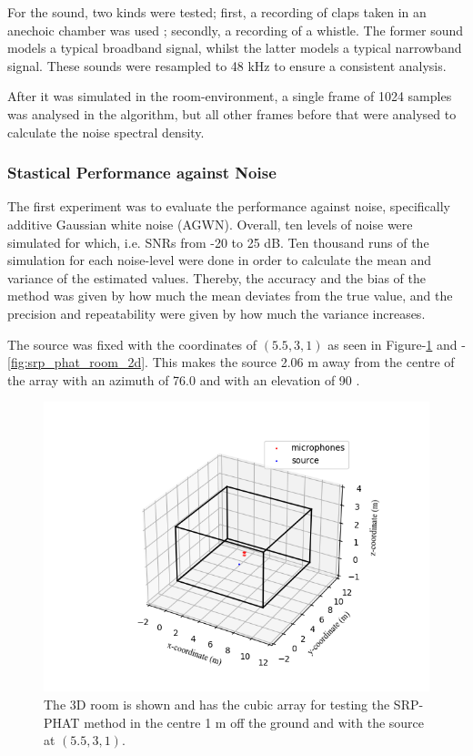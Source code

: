 \documentclass[notitlepage]{report}
\begin{document}
For the sound, two kinds were tested; first, a recording of claps taken in an anechoic chamber was used \cite{noauthor_handclaps_2005}; secondly, a recording of a whistle. The former sound models a typical broadband signal, whilst the latter models a typical narrowband signal. These sounds were resampled to 48 \si{kHz} to ensure a consistent analysis.

After it was simulated in the room-environment, a single frame of 1024 samples was analysed in the algorithm, but all other frames before that were analysed to calculate the noise spectral density.

\subsubsection{Stastical Performance against Noise}

The first experiment was to evaluate the performance against noise, specifically additive Gaussian white noise (AGWN). Overall, ten levels of noise were simulated for which, i.e. SNRs from -20 to 25 \si{dB}. Ten thousand runs of the simulation for each noise-level were done in order to calculate the mean and variance of the estimated values. Thereby, the accuracy and the bias of the method was given by how much the mean deviates from the true value, and the precision and repeatability were given by how much the variance increases.

The source was fixed with the coordinates of $(5.5,3,1)$  as seen in Figure-\ref{fig:srp_phat_room_3d} and -\ref{fig:srp_phat_room_2d}. This makes the source 2.06 \si{m} away from the centre of the array with an azimuth of 76.0 \si{\deg} and with an elevation of 90 \si{\deg}.

\begin{figure}[H]
\includegraphics[width=1\textwidth]{../Python/srp_phat/room_3d.png}
\centering
\caption{The 3D room is shown and has the cubic array for testing the SRP-PHAT method in the centre 1 \si{m} off the ground and with the source at $(5.5,3,1)$.}
\label{fig:srp_phat_room_3d}
\centering
\end{figure}
\end{document}
